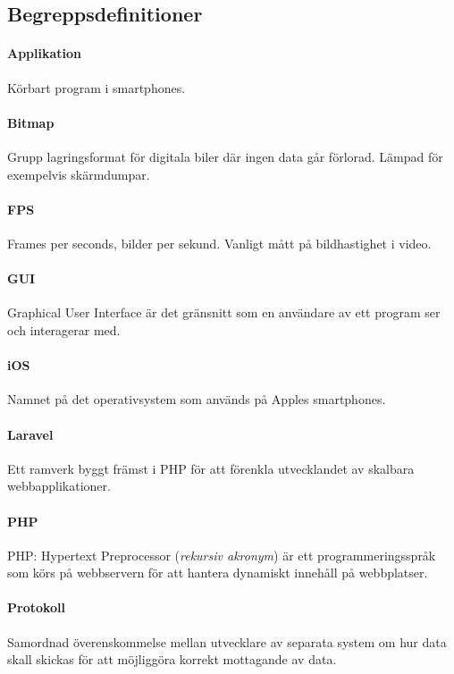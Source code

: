 \subsection{Begreppsdefinitioner}

\paragraph{Applikation} Körbart program i smartphones.

\paragraph{Bitmap} Grupp lagringsformat för digitala biler där ingen data går förlorad. Lämpad för exempelvis skärmdumpar.

\paragraph{FPS} Frames per seconds, bilder per sekund. Vanligt mått på bildhastighet i video.

\paragraph{GUI} Graphical User Interface är det gränsnitt som en användare av ett program ser och interagerar med.

\paragraph{iOS} Namnet på det operativsystem som används på Apples smartphones.

\paragraph{Laravel} Ett ramverk byggt främst i PHP för att förenkla utvecklandet av skalbara webbapplikationer\parencite{laravel}.

\paragraph{PHP} PHP: Hypertext Preprocessor (\textit{rekursiv akronym}) är ett programmeringsspråk som körs på webbservern för att hantera dynamiskt innehåll på webbplatser.

\paragraph{Protokoll} Samordnad överenskommelse mellan utvecklare av separata system om hur data skall skickas för att möjliggöra korrekt mottagande av data.

